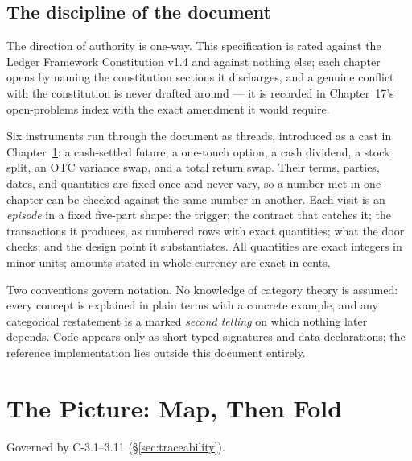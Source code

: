 \documentclass[11pt,a4paper]{article}
\begin{document}
\subsection{The discipline of the document}

The direction of authority is one-way. This specification is rated against the Ledger
Framework Constitution v1.4 and against nothing else; each chapter opens by naming the
constitution sections it discharges, and a genuine conflict with the constitution is
never drafted around --- it is recorded in Chapter~17's open-problems index with the
exact amendment it would require.

Six instruments run through the document as threads, introduced as a cast in
Chapter~\ref{ch:picture}: a cash-settled future, a one-touch option, a cash dividend,
a stock split, an OTC variance swap, and a total return swap. Their terms, parties,
dates, and quantities are fixed once and never vary, so a number met in one chapter
can be checked against the same number in another. Each visit is an \emph{episode} in
a fixed five-part shape: the trigger; the contract that catches it; the transactions
it produces, as numbered rows with exact quantities; what the door checks; and the
design point it substantiates. All quantities are exact integers in minor units;
amounts stated in whole currency are exact in cents.

Two conventions govern notation. No knowledge of category theory is assumed: every
concept is explained in plain terms with a concrete example, and any categorical
restatement is a marked \emph{second telling} on which nothing later depends. Code
appears only as short typed signatures and data declarations; the reference
implementation lies outside this document entirely.

\section{The Picture: Map, Then Fold}\label{ch:picture}

Governed by C-3.1--3.11 (\S\ref{sec:traceability}).
\end{document}
